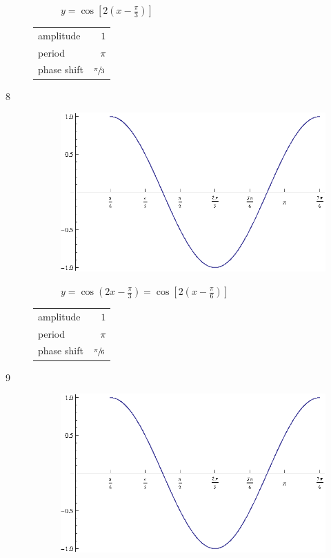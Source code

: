 \documentclass{exam}
\begin{document}
\begin{description}
\begin{figure}[H]
          $y = \cos \left[ 2 \left( x - \frac{\pi}{3} \right) \right]$
        \end{figure}

        \begin{tabular}[H]{lr}
          \toprule
          amplitude   & $1$ \\
          period      & $\pi$ \\
          phase shift & $\sfrac{\pi}{3}$ \\
          \bottomrule
        \end{tabular}

      \item[8]
        \begin{figure}[H]
          \centering
          \includegraphics[scale=0.8]{example08.eps}

          $y = \cos \left( 2x - \frac{\pi}{3} \right) = \cos \left[ 2 \left( x - \frac{\pi}{6} \right) \right]$
        \end{figure}

        \begin{tabular}[H]{lr}
          \toprule
          amplitude   & $1$ \\
          period      & $\pi$ \\
          phase shift & $\sfrac{\pi}{6}$ \\
          \bottomrule
        \end{tabular}

      \item[9]
        \begin{figure}[H]
          \centering
          \includegraphics[scale=0.8]{example09.eps}


\end{figure}
\end{description}
\end{document}
